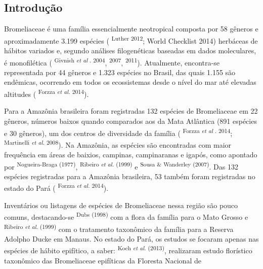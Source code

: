 \vspace*{-1.6mm}
{\noindent\fontsize{9}{10.8}\selectfont{Recebido em: 18/09/2014;
Aceito em: 09/12/2014.}}
\begin{multicols}{2}
\section*{Introdução}
\par{}Bromeliaceae é uma família essencialmente neotropical composta por 58 gêneros e aproximadamente 3.\allowbreak{}199 espécies (\allowbreak{} \textsuperscript{Luther 2012}; World Checklist 2014)\allowbreak{} herbáceas de hábitos variados e,\allowbreak{} segundo análises filogenéticas baseadas em dados moleculares,\allowbreak{} é monofilética (\allowbreak{} \textsuperscript{Givnish \textit{et al }.\allowbreak{} 2004},\allowbreak{} \textsuperscript{2007},\allowbreak{} \textsuperscript{2011})\allowbreak{}.\allowbreak{} Atualmente,\allowbreak{} encontra-\allowbreak{}se representada por 44 gêneros e 1.\allowbreak{}323 espécies no Brasil,\allowbreak{} das quais 1.\allowbreak{}155 são endêmicas,\allowbreak{} ocorrendo em todos os ecossistemas desde o nível do mar até elevadas altitudes (\allowbreak{} \textsuperscript{Forzza \textit{et al.\allowbreak{}} 2014})\allowbreak{}.\allowbreak{}\par{}Para a Amazônia brasileira foram registradas 132 espécies de Bromeliaceae em 22 gêneros,\allowbreak{} números baixos quando comparados aos da Mata Atlântica (\allowbreak{}891 espécies e 30 gêneros)\allowbreak{},\allowbreak{} um dos centros de diversidade da família (\allowbreak{} \textsuperscript{Forzza \textit{et al }.\allowbreak{} 2014}; \textsuperscript{Martinelli \textit{et al.\allowbreak{} } 2008})\allowbreak{}.\allowbreak{} Na Amazônia,\allowbreak{} as espécies são encontradas com maior frequência em áreas de baixios,\allowbreak{} campinas,\allowbreak{} campinaranas e igapós,\allowbreak{} como apontado por \textsuperscript{Nogueira-\allowbreak{}Braga (\allowbreak{}1977)\allowbreak{}},\allowbreak{} \textsuperscript{Ribeiro \textit{et al.\allowbreak{}} (\allowbreak{}1999)\allowbreak{}} e \textsuperscript{Sousa \&\allowbreak{\allowbreak{}\allowbreak{}}\allowbreak{} Wanderley (\allowbreak{}2007)\allowbreak{}}.\allowbreak{} Das 132 espécies registradas para a Amazônia brasileira,\allowbreak{} 53 também foram registradas no estado do Pará (\allowbreak{} \textsuperscript{Forzza \textit{et al.\allowbreak{}} 2014})\allowbreak{}.\allowbreak{}\par{}Inventários ou listagens de espécies de Bromeliaceae nessa região são pouco comuns,\allowbreak{} destacando-\allowbreak{}se \textsuperscript{Dubs (\allowbreak{}1998)\allowbreak{}} com a flora da família para o Mato Grosso e \textsuperscript{Ribeiro \textit{et al}.\allowbreak{} (\allowbreak{}1999)\allowbreak{} } com o tratamento taxonômico da família para a Reserva Adolpho Ducke em Manaus.\allowbreak{} No estado do Pará,\allowbreak{} os estudos se focaram apenas nas espécies de hábito epifítico,\allowbreak{} a saber:\allowbreak{} \textsuperscript{Koch \textit{et al.\allowbreak{}} (\allowbreak{}2013)\allowbreak{}},\allowbreak{} realizaram estudo florístico taxonômico das Bromeliaceae epifíticas da Floresta Nacional de 
\end{multicols}
